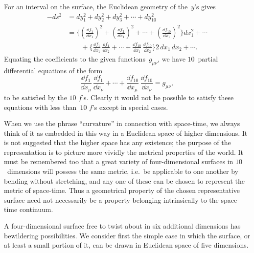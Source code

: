 \documentclass[12pt]{book}
\begin{document}
For an interval on the surface, the Euclidean geometry of the~$y$'s gives
\begin{align*}
  -ds^{2}
  &= dy_{1}^{2} + dy_{2}^{2} + dy_{3}^{2} + \cdots + dy_{10}^{2} \\
  &= \biggl\{\left(\frac{\dd f_{1}}{\dd x_{1}}\right)^{2}
  + \left(\frac{\dd f_{2}}{\dd x_{1}}\right)^{2} + \cdots
  + \left(\frac{\dd f_{10}}{\dd x_{1}}\right)^{2}\biggr\} dx_{1}^{2} + \cdots \\
  &\qquad + \biggl\{\frac{\dd f_{1}}{\dd x_{1}}\, \frac{\dd f_{1}}{\dd x_{2}}
  + \cdots + \frac{\dd f_{10}}{\dd x_{1}}\, \frac{\dd f_{10}}{\dd x_{2}}\biggr\}
  2\, dx_{1}\, dx_{2} + \cdots.
\end{align*}
Equating the coefficients to the given functions~$g_{\mu\nu}$, we have $10$~partial differential
equations of the form
\[
\frac{\dd f_{1}}{\dd x_{\mu}}\, \frac{\dd f_{1}}{\dd x_{\nu}}
+ \cdots + \frac{\dd f_{10}}{\dd x_{\mu}}\, \frac{\dd f_{10}}{\dd x_{\nu}}
= g_{\mu\nu},
\]
to be satisfied by the $10$ $f$'s. Clearly it would not be possible to satisfy these
equations with less than~$10$ $f$'s except in special cases.

When we use the phrase ``curvature'' in connection with space-time, we
always think of it as embedded in this way in a Euclidean space of higher
dimensions. It is not suggested that the higher space has any existence; the
purpose of the representation is to picture more vividly the metrical properties
of the world. It must be remembered too that a great variety of
four\hyp{}dimensional surfaces in $10$~dimensions will possess the same metric, i.e.\ be
applicable to one another by bending without stretching, and any one of these
can be chosen to represent the metric of space-time. Thus a geometrical property
of the chosen representative surface need not necessarily be a property
belonging intrinsically to the space-time continuum.

A four\hyp{}dimensional surface free to twist about in six additional dimensions
has bewildering possibilities. We consider first the simple case in which the
surface, or at least a small portion of it, can be drawn in Euclidean space of
five dimensions.
\end{document}
